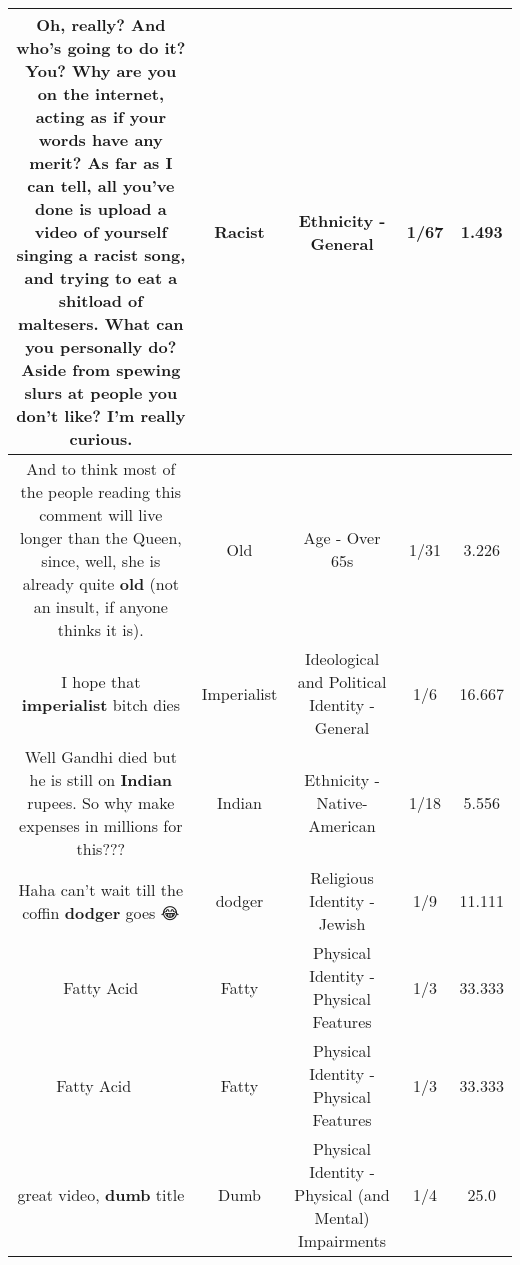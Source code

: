 \documentclass[11pt]{article}
\newlength\mylength
\begin{document}
\begin{center}
\begin{longtable}{|C{.65\mylength}|C{.30\mylength}|C{.12\mylength}|C{.12\mylength}|C{.12\mylength}|}
  \small Oh, really? And who's going to do it? You? Why are you on the internet, acting as if your words have any merit? As far as I can tell, all you've done is upload a video of yourself singing a \textbf{racist} song, and trying to eat a shitload of maltesers. What can you personally do? Aside from spewing slurs at people you don't like? I'm really curious.\normalsize   & Racist & Ethnicity - General & 1/67 & 1.493 \\  \hline
  \small And to think most of the people reading this comment will live longer than the Queen, since, well, she is already quite \textbf{old} (not an insult, if anyone thinks it is).\normalsize   & Old & Age - Over 65s & 1/31 & 3.226 \\  \hline
  \small I hope that \textbf{imperialist} bitch dies\normalsize   & Imperialist &  Ideological and Political Identity - General & 1/6 & 16.667 \\  \hline
  \small Well Gandhi died but he is still on \textbf{Indian} rupees. So why make expenses in millions for this???\normalsize   & Indian & Ethnicity - Native-American & 1/18 & 5.556 \\  \hline
  \small Haha can't wait till the coffin \textbf{dodger} goes 😂\normalsize   & dodger & Religious Identity - Jewish & 1/9 & 11.111 \\  \hline
  \small Fatty Acid  \normalsize   & Fatty & Physical Identity - Physical Features & 1/3 & 33.333 \\  \hline
  \small Fatty Acid 👏👏\normalsize   & Fatty & Physical Identity - Physical Features & 1/3 & 33.333 \\  \hline
  \small great video, \textbf{dumb} title\normalsize   & Dumb & Physical Identity - Physical (and Mental) Impairments & 1/4 & 25.0 \\  \hline

\end{longtable}
\end{center}
\end{document}
